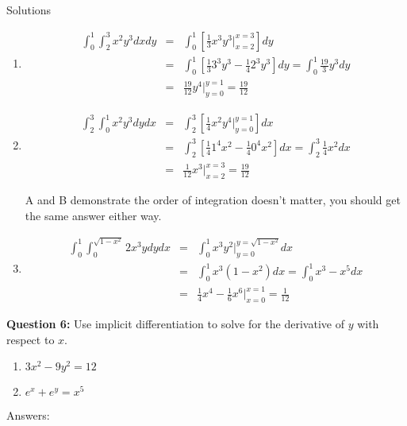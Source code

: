 \documentclass[10pt]{amsart}
\begin{document}
Solutions
\begin{enumerate}
\item
\begin{eqnarray*}
 \int_{0}^1 \int_{2}^{3} x^2y^3 dxdy &=& \int_0^1 [\frac{1}{3} x^3y^3 |^{x=3}_{x=2}]dy\\
 &=& \int_{0}^{1} [\frac{1}{3} 3^3y^3 - \frac{1}{4} 2^3y^3] dy = \int_{0}^{1} \frac{19}{3} y^3 dy\\
 &=& \frac{19}{12}y^4 |_{y=0}^{y=1} = \frac{19}{12}
\end{eqnarray*}

\item
\begin{eqnarray*}
 \int_{2}^3 \int_{0}^{1} x^2y^3 dydx &=& \int_2^3 [\frac{1}{4} x^2y^4 |^{y=1}_{y=0}]dx\\
 &=& \int_{2}^{3} [\frac{1}{4} 1^4 x^2 - \frac{1}{4} 0^4 x^2 ] dx = \int_{2}^{3} \frac{1}{4} x^2 dx\\
 &=& \frac{1}{12}x^3 |_{x=2}^{x=3} = \frac{19}{12}
\end{eqnarray*}

A and B demonstrate the order of integration doesn't matter, you should get the same answer either way. 

\item
\begin{eqnarray*}
\int_{0}^1 \int_0^{\sqrt{1-x^2}} 2x^3ydydx &=& \int_{0}^1 x^3 y^2 |_{y=0}^{y=\sqrt{1 - x^2}} dx\\
&=& \int_0^1 x^3 (1 - x^2) dx = \int_0^1 x^3 - x^5 dx\\
&=& \frac{1}{4} x^4 - \frac{1}{6}x^6 |_{x=0}^{x=1} = \frac{1}{12}
\end{eqnarray*}


\end{enumerate}

\textbf{Question 6:} Use implicit differentiation to solve for the derivative of $y$ with respect to $x$.

\begin{enumerate}
\item $3x^2 - 9y^2 = 12$\\
\item$ e^x +e^y = x^5$\\
\end{enumerate}
\bigskip
Answers:\\
\end{document}
